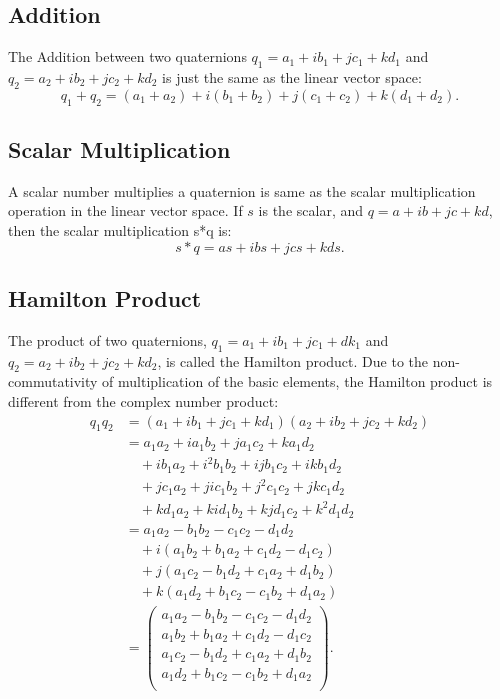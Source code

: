 \documentclass{article}
\begin{document}
\subsection{Addition}

The Addition between two quaternions $q_1 = a_1 + ib_1+jc_1+kd_1$ and $q_2 = a_2 + ib_2+jc_2+kd_2$ is just the same as the linear vector space:
\begin{equation}
  q_1 + q_2 = (a_1+a_2) + i(b_1+b_2) + j(c_1+c_2) + k(d_1+d_2).
\end{equation}

\subsection{Scalar Multiplication}

A scalar number multiplies a quaternion is same as the scalar multiplication operation in the linear vector space. If $s$ is the scalar, and $q=a+ib+jc+kd$, then the scalar multiplication s*q is:
\begin{equation}
  s*q =  as+ibs+jcs+kds.
\end{equation}

\subsection{Hamilton Product}

The product of two quaternions, $q_1=a_1+ib_1+jc_1+dk_1$ and $q_2=a_2+ib_2+jc_2+kd_2$, is called the Hamilton product. Due to the non-commutativity of multiplication of the basic elements, the Hamilton product is different from the complex number product:
\begin{equation}
  \begin{split}
    q_1q_2 &= (a_1+ib_1+jc_1+kd_1)(a_2+ib_2+jc_2+kd_2) \\
    &= a_1a_2+ia_1b_2+ja_1c_2+ka_1d_2             \\
    &\quad +ib_1a_2+i^2b_1b_2+ijb_1c_2+ikb_1d_2   \\
    &\quad +jc_1a_2+jic_1b_2+j^2c_1c_2+jkc_1d_2   \\
    &\quad +kd_1a_2+kid_1b_2+kjd_1c_2+k^2d_1d_2   \\
    &= a_1a_2-b_1b_2-c_1c_2-d_1d_2                \\
    &\quad +i(a_1b_2+b_1a_2+c_1d_2-d_1c_2)         \\
    &\quad +j(a_1c_2-b_1d_2+c_1a_2+d_1b_2)         \\
    &\quad +k(a_1d_2+b_1c_2-c_1b_2+d_1a_2)         \\
    & = \begin{pmatrix}
      a_1a_2-b_1b_2-c_1c_2-d_1d_2         \\
      a_1b_2+b_1a_2+c_1d_2-d_1c_2         \\
      a_1c_2-b_1d_2+c_1a_2+d_1b_2         \\
      a_1d_2+b_1c_2-c_1b_2+d_1a_2         \\
    \end{pmatrix}.
  \end{split}
\end{equation}
\end{document}
